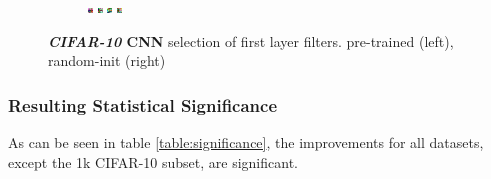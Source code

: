 \documentclass{article}
\begin{document}
\begin{figure}
\begin{subfigure}{.4\linewidth}
              \includegraphics[width=0.1\linewidth]{../graphics/cifar_filters/random_15.png}
              \includegraphics[width=0.1\linewidth]{../graphics/cifar_filters/random_16.png} %
              \includegraphics[width=0.1\linewidth]{../graphics/cifar_filters/random_17.png} %
              \includegraphics[width=0.1\linewidth]{../graphics/cifar_filters/random_18.png}
            \end{subfigure}

          \caption{\textbf{\emph{CIFAR-10} CNN} selection of first layer filters. pre-trained (left), random-init (right)}
          \label{fig:cifar_filters}

      \end{figure}


      
  \subsubsection{Resulting Statistical Significance}
    As can be seen in table \ref{table:significance}, the improvements for all datasets, except the 1k CIFAR-10 subset, are significant.
\end{document}
